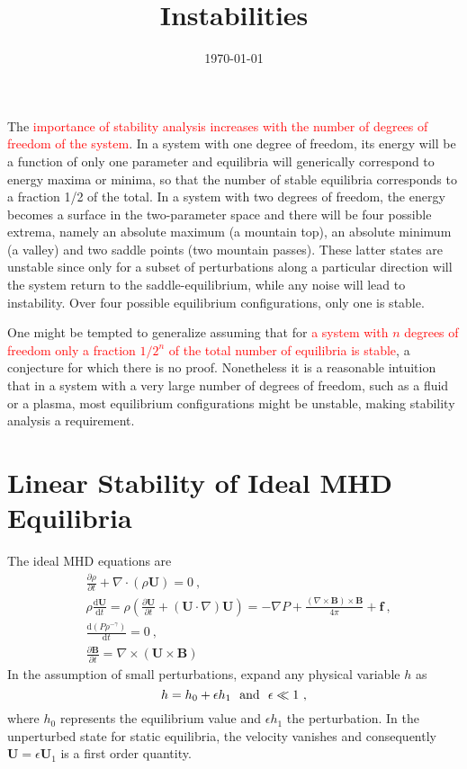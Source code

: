 \documentclass[12pt,a4paper]{article}
\title{Instabilities}
\author{}
\date{\today}
\renewcommand{\vec}[1]{\boldsymbol{#1}}
\newcommand{\dif}{\mathrm{d}}
\begin{document}
\maketitle

The \textcolor{red}{importance of stability analysis increases with the number of degrees of freedom of the system}. In a system with one degree of freedom, its energy will be a function of only one parameter and equilibria will generically correspond to energy maxima or minima, so that the number of stable equilibria corresponds to a fraction 1/2 of the total. In a system with two degrees of freedom, the energy becomes a surface in the two-parameter space and there will be four possible extrema, namely an absolute maximum (a mountain top), an absolute minimum (a valley) and two saddle points (two mountain passes). These latter states are unstable since only for a subset of perturbations along a particular direction will the system return to the saddle-equilibrium, while any noise will lead to instability. Over four possible equilibrium configurations, only one is stable.

One might be tempted to generalize assuming that for \textcolor{red}{a system with $n$ degrees of freedom only a fraction $1/2^n$ of the total number of equilibria is stable}, a conjecture for which there is no proof. Nonetheless it is a reasonable intuition that in a system with a very large number of degrees of freedom, such as a fluid or a plasma, most equilibrium configurations might be unstable, making stability analysis a requirement.



\section{Linear Stability of Ideal MHD Equilibria}
The ideal MHD equations are
\begin{align*}
& \frac{\partial \rho}{\partial t} + \nabla\cdot (\rho \vec{U}) = 0 ~, \\
& \rho \frac{\dif \vec{U}}{\dif t} = \rho\left(\frac{\partial \vec{U}}{\partial t} + (\vec{U}\cdot \nabla) \vec{U} \right) = -\nabla P +\frac{(\nabla \times \vec{B}) \times \vec{B} }{4\pi} + \vec{f} ~, \\
& \frac{\dif (P \rho^{-\gamma} )}{\dif t} = 0 ~, \\
& \frac{\partial \vec{B}}{\partial t} = \nabla \times (\vec{U}\times \vec{B}) 
\end{align*}
In the assumption of small perturbations, expand any physical variable $h$ as
\begin{equation*}
h = h_0 +\epsilon h_1 ~~{\rm and}~~ \epsilon \ll 1 ~,
\end{equation*}
where $h_0$ represents the equilibrium value and $\epsilon h_1$ the perturbation. In the unperturbed state for static equilibria, the velocity vanishes and consequently $\vec{U} = \epsilon \vec{U}_1$ is a first order quantity.
\end{document}
